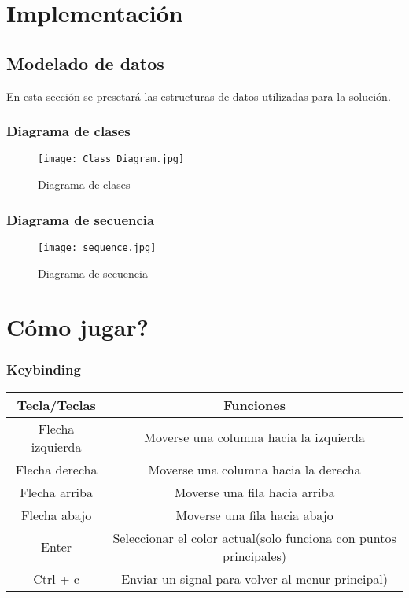 \documentclass[letter]{article}
\begin{document}
\section{Implementaci\'on}
\subsection{Modelado de datos}
En esta secci\'on se presetar\'a las estructuras de datos utilizadas para la soluci\'on.
\subsubsection{Diagrama de clases}
\begin{figure}[H]
	\centerline{\texttt{[image: Class Diagram.jpg]}}
	\caption{Diagrama de clases}
	\label{fig}
\end{figure}
\newpage
\subsubsection{Diagrama de secuencia}
\vspace{1cm}
\begin{figure}[H]
	\centerline{\texttt{[image: sequence.jpg]}}
	\caption{Diagrama de secuencia}
	\label{fig}
\end{figure}
\vspace{1cm}
\section{C\'omo jugar?}
\subsubsection{Keybinding}
\begin{center}
	\begin{tabular}{ |c|c| }
		\hline
		\textbf{Tecla/Teclas} & \textbf{Funciones}                                                \\
		\hline
		Flecha izquierda      & Moverse una columna hacia la izquierda                            \\
		\hline
		Flecha derecha        & Moverse una columna hacia la derecha                              \\
		\hline
		Flecha arriba         & Moverse una fila hacia arriba                                     \\
		\hline
		Flecha abajo          & Moverse una fila hacia abajo                                      \\
		\hline
		Enter                 & Seleccionar el color actual(solo funciona con puntos principales) \\
		\hline
		Ctrl + c              & Enviar un signal para volver al menur principal)                  \\
		\hline
	\end{tabular}
\end{center}
\end{document}

